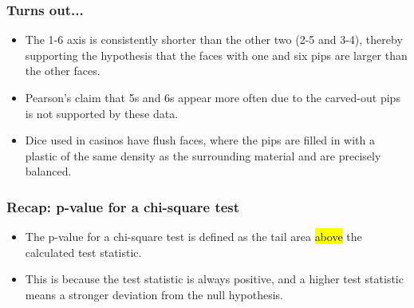 \documentclass[slidestop,compress,mathserif]{beamer}
\begin{document}
\begin{frame}
\frametitle{Turns out...}

\begin{itemize}

\item The 1-6 axis is consistently shorter than the other two (2-5 and 3-4), thereby supporting the hypothesis that the faces with one and six pips are larger than the other faces.

\item Pearson's claim that 5s and 6s appear more often due to the carved-out pips is not supported by these data.

\item Dice used in casinos have flush faces, where the pips are filled in with a plastic of the same density as the surrounding material and are precisely balanced.

\end{itemize}

\begin{center}
\end{center}


\end{frame}


\begin{frame}
\frametitle{Recap: p-value for a chi-square test}

\begin{itemize}

\item The p-value for a chi-square test is defined as the tail area \hl{above} the calculated test statistic.

\item This is because the test statistic is always positive, and a higher test statistic means a stronger deviation from the null hypothesis.

\end{itemize}

\begin{center}
\end{center}

\end{frame}

\end{document}
